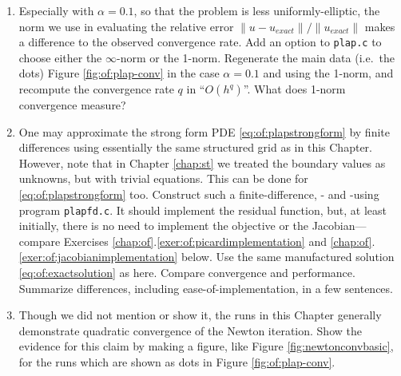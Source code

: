 \begin{enumerate}
\item Especially with $\alpha=0.1$, so that the problem is less uniformly-elliptic, the norm we use in evaluating the relative error $\|u-u_{exact}\|/\|u_{exact}\|$ makes a difference to the observed convergence rate.  Add an option to \texttt{plap.c} to choose either the $\infty$-norm or the 1-norm.  Regenerate the main data (i.e.~the dots) Figure \ref{fig:of:plap-conv} in the case $\alpha=0.1$ and using the 1-norm, and recompute the convergence rate $q$ in ``$O(h^q)$''.  What does 1-norm convergence measure?

\item One may approximate the strong form PDE \eqref{eq:of:plapstrongform} by finite differences using essentially the same structured grid as in this Chapter.  However, note that in Chapter \ref{chap:st} we treated the boundary values as unknowns, but with trivial equations.  This can be done for \eqref{eq:of:plapstrongform} too.  Construct such a finite-difference, \pSNES- and \pDMDA-using program \texttt{plapfd.c}.  It should implement the residual function, but, at least initially, there is no need to implement the objective or the Jacobian---compare Exercises \ref{chap:of}.\ref{exer:of:picardimplementation} and \ref{chap:of}.\ref{exer:of:jacobianimplementation} below.  Use the same manufactured solution \eqref{eq:of:exactsolution} as here.  Compare convergence and performance.  Summarize differences, including ease-of-implementation, in a few sentences.

\item  Though we did not mention or show it, the runs in this Chapter generally demonstrate quadratic convergence of the Newton iteration.  Show the evidence for this claim by making a figure, like Figure \ref{fig:newtonconvbasic}, for the runs which are shown as dots in Figure \ref{fig:of:plap-conv}.


\end{enumerate}
